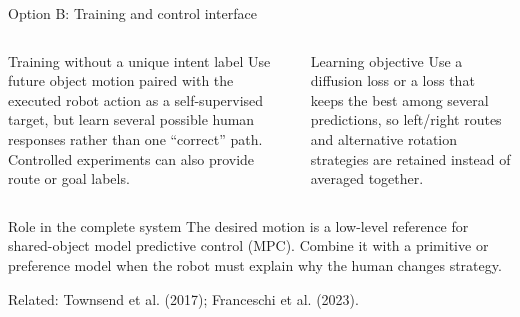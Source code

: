 \documentclass[aspectratio=169,11pt]{beamer}
\newcommand{\pinkcomment}[1]{\textcolor{pink}{\textbf{#1}}}
\begin{document}
\begin{frame}{Option B: Training and control interface}
\begin{columns}[T,onlytextwidth]
\begin{block}{Training without a unique intent label}
Use future object motion paired with the executed robot action as a self-supervised target, but learn several possible human responses rather than one ``correct'' path. Controlled experiments can also provide route or goal labels.
\end{block}
\begin{block}{Learning objective}
Use a diffusion loss or a loss that keeps the best among several predictions, so left/right routes and alternative rotation strategies are retained instead of averaged together.
\end{block}
\end{columns}
\vspace{0.2cm}
\begin{alertblock}{Role in the complete system}
The desired motion is a low-level reference for shared-object model predictive control (MPC). Combine it with a primitive or preference model when the robot must explain why the human changes strategy.
\end{alertblock}
\vspace{0.12cm}
Related: Townsend et al. (2017); Franceschi et al. (2023).
\end{frame}
\end{document}
